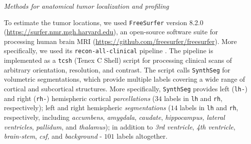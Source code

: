 \documentclass[a4paper,11pt,leqno]{article}
\begin{document}
\noindent \emph{Methods for anatomical tumor localization and profiling}

\vspace{2mm}

To estimate the tumor locations, we used \texttt{FreeSurfer} version 8.2.0 \cite{Fischl2012} \\ %
({\small \url{https://surfer.nmr.mgh.harvard.edu}}),
an open-source software suite for processing human brain MRI
({\small \url{https://github.com/freesurfer/freesurfer}}). More specifically, we
used its \texttt{recon-all-clinical} pipeline
\cite{Billot2023a,Billot2023b,Gopinath2023,Iglesias2023}.
The pipeline is implemented as a \texttt{tcsh} (Tenex C Shell) script for
processing clinical scans of arbitrary orientation, resolution, and
contrast. The script calls \texttt{SynthSeg} \cite{Billot2023a} %
for volumetric segmentations, which provide multiple labels covering a wide
range of cortical and subcortical structures. More specifically,
\texttt{SynthSeg} provides left (\texttt{lh-}) and right (\texttt{rh-}) hemispheric cortical
\emph{parcellations} ($34$ labels in \texttt{lh} and \texttt{rh}, respectively); left and
right hemispheric \emph{segmentations} ($14$ labels in \texttt{lh} and \texttt{rh},
respectively, including \emph{accumbens}, \emph{amygdala},
\emph{caudate}, \emph{hippocampus,} \emph{lateral ventricles},
\emph{pallidum}, and \emph{thalamus}); in addition to \emph{3rd
ventricle}, \emph{4th ventricle}, \emph{brain-stem}, \emph{csf,} and
\emph{background} - $101$ labels altogether.
\end{document}
